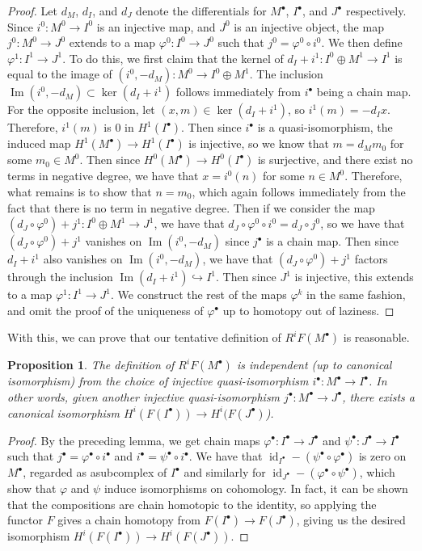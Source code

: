 \documentclass[psamsfonts, 12pt]{amsart}
\newtheorem{prop}[thm]{Proposition}
\theoremstyle{definition}
\theoremstyle{remark}
\DeclareMathOperator{\id}{id}
\DeclareMathOperator{\im}{Im}
\begin{document}
\begin{proof}
Let $d_M$, $d_I$, and $d_J$ denote the differentials for $M^\bullet$, $I^\bullet$,
and $J^\bullet$ respectively. Since $i^0 : M^0 \to I^0$ is an injective map,
and $J^0$ is an injective object, the map $j^0 : M^0 \to J^0$ extends to a map
$\varphi^0 : I^0 \to J^0$ such that $j^0 = \varphi^0 \circ i^0$. We then define
$\varphi^1 : I^1 \to J^1$. To do this, we first claim that the kernel
of $d_I + i^1 : I^0 \oplus M^1 \to I^1$ is equal to the image of
$(i^0,-d_M) : M^0 \to I^0 \oplus M^1$. The inclusion
$\im(i^0,-d_M) \subset \ker(d_I + i^1)$ follows immediately from $i^\bullet$
being a chain map. For the opposite inclusion, let $(x,m) \in \ker(d_I + i^1)$,
so $i^1(m) = -d_Ix$. Therefore, $i^1(m)$ is $0$ in $H^1(I^\bullet)$. Then since
$i^\bullet$ is a quasi-isomorphism, the induced map $H^1(M^\bullet) \to H^1(I^\bullet)$
is injective, so we know that $m = d_Mm_0$ for some $m_0 \in M^0$.
Then since $H^0(M^\bullet) \to H^0(I^\bullet)$ is surjective, and there exist
no terms in negative degree, we have that $x = i^0(n)$ for some $n \in M^0$.
Therefore, what remains is to show that $n = m_0$, which again follows immediately
from the fact that there is no term in negative degree. Then if we
consider the map $(d_J \circ \varphi^0) + j^1 : I^0\oplus M^1 \to J^1$,
we have that $d_J \circ \varphi^0 \circ i^0 = d_J \circ j^0$, so we
have that $(d_J \circ \varphi^0) + j^1$ vanishes on $\im(i^0,-d_M)$ since
$j^\bullet$ is a chain map. Then since $d_I + i^1$ also vanishes on $\im(i^0,-d_M)$,
we have that $(d_J \circ \varphi^0) + j^1$ factors through the
inclusion $\im(d_I + i^1) \hookrightarrow I^1$. Then since $J^1$ is
injective, this extends to a map $\varphi^1: I^1 \to J^1$. We construct
the rest of the maps $\varphi^k$ in the same fashion, and omit the proof
of the uniqueness of $\varphi^\bullet$ up to homotopy out of laziness.
\end{proof}
%
With this, we can prove that our tentative definition of $R^iF(M^\bullet)$ is
reasonable.
%
\begin{prop}
The definition of $R^iF(M^\bullet)$ is independent (up to canonical isomorphism)
from the choice of injective quasi-isomorphism $i^\bullet : M^\bullet \to I^\bullet$.
In other words, given another injective quasi-isomorphism
$j^\bullet : M^\bullet \to J^\bullet$, there exists a canonical isomorphism
$H^i(F(I^\bullet)) \to H^i(F(J^\bullet)$).
\end{prop}
%
\begin{proof}
By the preceding lemma, we get chain maps $\varphi^\bullet : I^\bullet \to J^\bullet$
and $\psi^\bullet : J^\bullet \to I^\bullet$ such that
$j^\bullet = \varphi^\bullet \circ i^\bullet$ and
$i^\bullet = \psi^\bullet \circ i^\bullet$. We have that
$\id_{I^\bullet} - (\psi^\bullet \circ \varphi^\bullet)$ is zero on $M^\bullet$,
regarded as asubcomplex  of $I^\bullet$ and similarly for
$\id_{J^\bullet} - (\varphi^\bullet\circ \psi^\bullet)$,
which show that $\varphi$ and $\psi$ induce isomorphisms on cohomology.
In fact, it can be shown that the compositions are chain homotopic to the
identity, so applying the functor $F$ gives a chain homotopy
from $F(I^\bullet) \to F(J^\bullet)$, giving us the desired isomorphism
$H^i(F(I^\bullet)) \to H^i(F(J^\bullet))$.
\end{proof}
\end{document}
